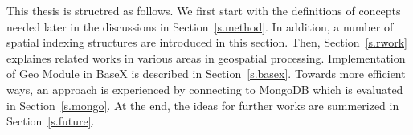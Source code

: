 \documentclass[a4paper,12pt]{article}
\begin{document}

This thesis is structred as follows. We first start with the definitions of concepts needed later in the discussions
in Section~\ref{s.method}. In addition, a number of spatial indexing structures are introduced in this section. 
Then, Section~\ref{s.rwork} explaines related works in various areas in geospatial processing. Implementation of Geo Module in BaseX is described in Section~\ref{s.basex}. 
Towards more efficient ways, an approach is experienced by connecting to MongoDB which is evaluated in Section~\ref{s.mongo}.
At the end, the ideas for further works are summerized in
Section~\ref{s.future}.


\newpage
\end{document}
